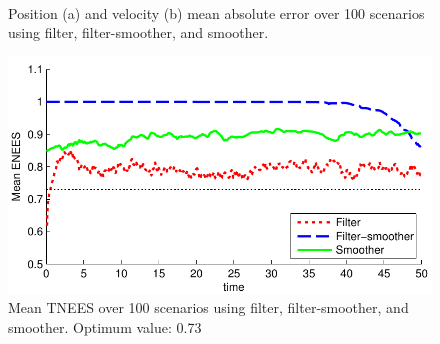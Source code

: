 \documentclass[10pt,twocolumn,twoside]{IEEEtran}
\begin{document}
%
\begin{figure}[!t]
\centering
{} \\
\caption{Position (a) and velocity (b) mean absolute error over 100 scenarios using filter, filter-smoother, and smoother.}
\label{fig:tracking_rmse}
\end{figure}
%
\begin{figure}[!t]
\centering
\includegraphics[width=0.9\columnwidth]{tracking_mtnees.pdf}
\caption{Mean TNEES over 100 scenarios using filter, filter-smoother, and smoother. Optimum value: 0.73}
\label{fig:tracking_mtnees}
\end{figure}
\end{document}
